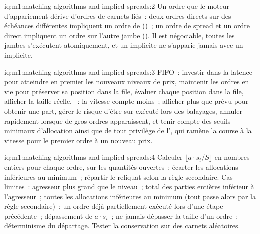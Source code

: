 \begin{solution}{iq:m1:matching-algorithms-and-implied-spreads:2}
Un ordre que le moteur d'appariement dérive d'ordres de carnets liés~: deux
ordres directs sur des échéances différentes impliquent un ordre de
 ()~; un ordre de spread et un ordre direct impliquent un ordre sur l'autre jambe
(). Il est négociable, toutes les jambes s'exécutent atomiquement, et un implicite
ne s'apparie jamais avec un implicite.
\end{solution}

\begin{solution}{iq:m1:matching-algorithms-and-implied-spreads:3}
FIFO~: investir dans la latence pour atteindre en premier les nouveaux niveaux de prix, maintenir les ordres
en vie pour préserver sa position dans la file, évaluer chaque position dans la file, afficher la taille réelle.
~: la vitesse compte moins~; afficher plus que prévu pour obtenir une part,
gérer le risque d'être sur-exécuté lors des balayages, annuler rapidement lorsque de gros
ordres apparaissent, et tenir compte des seuils minimaux d'allocation ainsi que de tout
privilège de l', qui ramène la course à la vitesse pour le premier ordre
à un nouveau prix.
\end{solution}

\begin{solution}{iq:m1:matching-algorithms-and-implied-spreads:4}
Calculer $\lfloor a \cdot s_i / S\rfloor$ en nombres entiers pour chaque ordre, sur les quantités ouvertes~;
écarter les allocations inférieures au minimum~; répartir le reliquat selon
la règle secondaire. Cas limites~: agresseur plus grand que le niveau~; total des parties entières inférieur à l'agresseur~;
toutes les allocations inférieures au minimum (tout passe alors par la règle secondaire)~;
un ordre déjà partiellement exécuté lors d'une
étape précédente~; dépassement de $a \cdot s_i$~; ne jamais dépasser la taille d'un ordre~;
déterminisme du départage. Tester la conservation sur des carnets aléatoires.
\end{solution}

